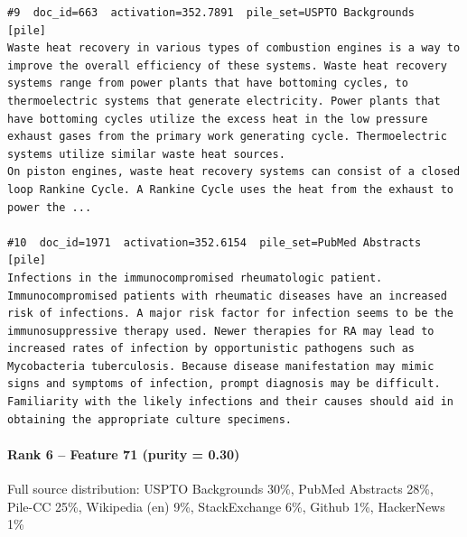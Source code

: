 \begin{verbatim}
#9  doc_id=663  activation=352.7891  pile_set=USPTO Backgrounds  [pile]
Waste heat recovery in various types of combustion engines is a way to improve the overall efficiency of these systems. Waste heat recovery systems range from power plants that have bottoming cycles, to thermoelectric systems that generate electricity. Power plants that have bottoming cycles utilize the excess heat in the low pressure exhaust gases from the primary work generating cycle. Thermoelectric systems utilize similar waste heat sources.
On piston engines, waste heat recovery systems can consist of a closed loop Rankine Cycle. A Rankine Cycle uses the heat from the exhaust to power the ...

#10  doc_id=1971  activation=352.6154  pile_set=PubMed Abstracts  [pile]
Infections in the immunocompromised rheumatologic patient.
Immunocompromised patients with rheumatic diseases have an increased risk of infections. A major risk factor for infection seems to be the immunosuppressive therapy used. Newer therapies for RA may lead to increased rates of infection by opportunistic pathogens such as Mycobacteria tuberculosis. Because disease manifestation may mimic signs and symptoms of infection, prompt diagnosis may be difficult. Familiarity with the likely infections and their causes should aid in obtaining the appropriate culture specimens.

\end{verbatim}

\paragraph*{Rank 6 -- Feature 71 (purity = 0.30)}

Full source distribution: USPTO Backgrounds 30\%, PubMed Abstracts 28\%, Pile-CC 25\%, Wikipedia (en) 9\%, StackExchange 6\%, Github 1\%, HackerNews 1\%

